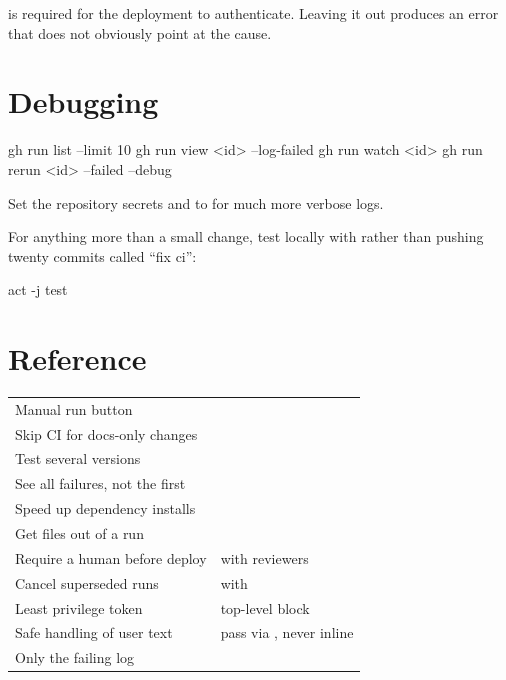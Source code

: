 \documentclass[11pt]{article}
\begin{document}
 is required for the deployment to authenticate. Leaving it out
produces an error that does not obviously point at the cause.

\section{Debugging}

\begin{shell}
gh run list --limit 10
gh run view <id> --log-failed
gh run watch <id>
gh run rerun <id> --failed --debug
\end{shell}

Set the repository secrets  and 
to  for much more verbose logs.

For anything more than a small change, test locally with  rather than pushing
twenty commits called ``fix ci'':

\begin{shell}
act -j test
\end{shell}

\section{Reference}

\vspace{0.5em}
\begin{tabularx}{\linewidth}{@{}L{6.2cm} X@{}}
\toprule
{} &  \\
\midrule
Manual run button &  \\
Skip CI for docs-only changes &  \\
Test several versions &  \\
See all failures, not the first &  \\
Speed up dependency installs &  \\
Get files out of a run &  \\
Require a human before deploy &  with reviewers \\
Cancel superseded runs &  with  \\
Least privilege token & top-level  block \\
Safe handling of user text & pass via , never inline \\
Only the failing log &  \\
\bottomrule
\end{tabularx}
\vspace{0.5em}
\end{document}
